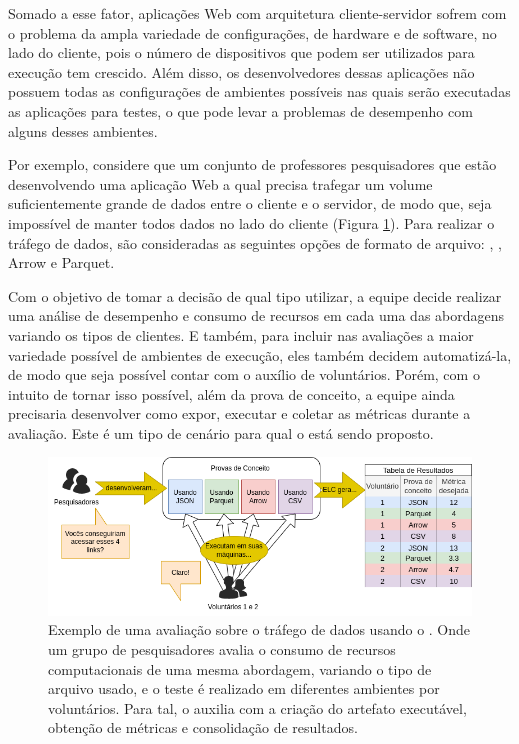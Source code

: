 \documentclass[12pt]{tcc}
\begin{document}
	Somado a esse fator, aplicações Web com arquitetura cliente-servidor sofrem com o problema da ampla variedade de configurações, de hardware e de software, no lado do cliente, pois o número de dispositivos que podem ser utilizados para execução tem crescido. Além disso, os desenvolvedores dessas aplicações não possuem todas as configurações de ambientes possíveis nas quais serão executadas as aplicações para testes, o que pode levar a problemas de desempenho com alguns desses ambientes. 

	Por exemplo, considere que um conjunto de professores pesquisadores que estão desenvolvendo uma aplicação Web a qual precisa trafegar um volume suficientemente grande de dados entre o cliente e o servidor, de modo que, seja impossível de manter todos dados no lado do cliente (Figura \ref{fig:exemplo-tipo-de-dado}). Para realizar o tráfego de dados, são consideradas as seguintes opções de formato de arquivo: , , Arrow e Parquet. 

	Com o objetivo de tomar a decisão de qual tipo utilizar, a equipe decide realizar uma análise de desempenho e consumo de recursos em cada uma das abordagens variando os tipos de clientes. E também, para incluir nas avaliações a maior variedade possível de ambientes de execução, eles também decidem automatizá-la, de modo que seja possível contar com o auxílio de voluntários. Porém, com o intuito de tornar isso possível, além da prova de conceito, a equipe ainda precisaria desenvolver como expor, executar e coletar as métricas durante a avaliação. Este é um tipo de cenário para qual o  está sendo proposto. 

	\begin{figure}[!ht]
		\centering
		\includegraphics[width=\textwidth]{figures/exemplo-tipo-de-dado.png}
		\caption{Exemplo de uma avaliação sobre o tráfego de dados usando o . Onde um grupo de pesquisadores avalia o consumo de recursos computacionais de uma mesma abordagem, variando o tipo de arquivo usado, e o teste é realizado em diferentes ambientes por voluntários. Para tal, o  auxilia com a criação do artefato executável, obtenção de métricas e consolidação de resultados.}
		\label{fig:exemplo-tipo-de-dado}
	\end{figure}
\end{document}
